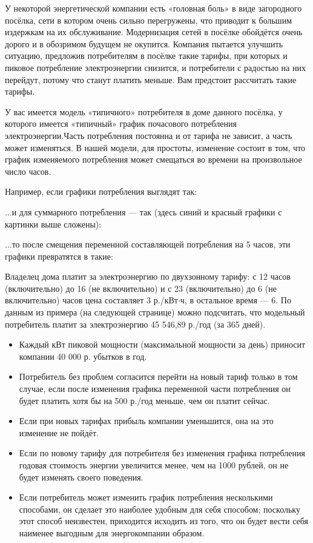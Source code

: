 
У некоторой энергетической компании есть «головная боль» в виде загородного посёлка, сети в котором 
очень сильно перегружены, что приводит к большим издержкам на их обслуживание. Модернизация 
сетей в посёлке обойдётся очень дорого и в обозримом будущем не окупится. Компания пытается улучшить 
ситуацию, предложив потребителям в посёлке такие тарифы, при которых и пиковое потребление электроэнергии 
снизится, и потребители с радостью на них перейдут, потому что станут платить меньше. Вам предстоит 
рассчитать такие тарифы.

У вас имеется модель «типичного» потребителя в доме данного посёлка, у которого имеется «типичный» 
график почасового потребления электроэнергии.Часть потребления постоянна и от тарифа не зависит, 
а часть может изменяться. В нашей модели, для простоты, изменение состоит в том, что график 
изменяемого потребления может смещаться во времени на произвольное число часов.

Например, если графики потребления выглядят так:

...и для суммарного потребления — так (здесь синий и красный графики с картинки выше сложены):

...то после смещения переменной составляющей потребления на 5 часов, эти графики превратятся в такие:



Владелец дома платит за электроэнергию по двухзонному тарифу: с 12 часов (включительно) до 16 
(не включительно) и с 23 (включительно) до 6 (не включительно) часов цена составляет 3 р./кВт$\cdot$ч, в 
остальное время — 6. По данным из примера (на следующей странице) можно подсчитать, что модельный 
потребитель платит за электроэнергию 45 546,89 р./год (за 365 дней).

\begin{itemize}
    \item Каждый кВт пиковой мощности (максимальной мощности за день) приносит компании 40 000 р. 
    убытков в год.
    \item Потребитель без проблем согласится перейти на новый тариф только в том случае, если после изменения графика переменной части потребления он будет платить хотя бы на 500 р./год меньше, чем он платит сейчас.
    \item Если при новых тарифах прибыль компании уменьшится, она на это изменение не пойдёт.
    \item Если по новому тарифу для потребителя без изменения графика потребления годовая стоимость энергии увеличится менее, чем на 1000 рублей, он не будет изменять своего поведения.
    \item Если потребитель может изменить график потребления несколькими способами, он сделает это наиболее удобным для себя способом; поскольку этот способ неизвестен, приходится исходить из того, что он будет вести себя наименее выгодным для энергокомпании образом.
\end{itemize}

